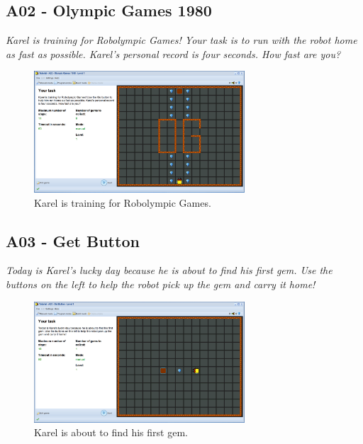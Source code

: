 \documentclass[article,A4,12pt]{llncs}
\begin{document}
\newpage

\subsection{A02 - Olympic Games 1980}

{\em Karel is training for Robolympic Games! Your task is to run with 
the robot home as fast as possible. Karel's personal record is four seconds. How fast are you?}

\begin{figure}[!ht]
\begin{center}
\includegraphics[width=0.7\textwidth]{img/a02.png}
\end{center}
\vspace{-4mm}
\caption{Karel is training for Robolympic Games.}
\label{fig:a02}
\vspace{-4mm}
\end{figure}
\noindent

\subsection{A03 - Get Button}

{\em Today is Karel's lucky day because he is about to find his first gem. 
Use the buttons on the left to help the robot pick up the gem and carry it 
home!}

\begin{figure}[!ht]
\begin{center}
\includegraphics[width=0.7\textwidth]{img/a03.png}
\end{center}
\vspace{-4mm}
\caption{Karel is about to find his first gem.}
\label{fig:a03}
\vspace{-1cm}
\end{figure}
\noindent
\newpage
\end{document}
